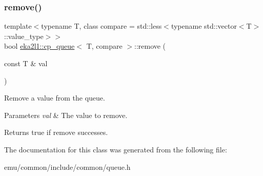 \subsubsection{\texorpdfstring{remove()}{remove()}}
{\footnotesize\ttfamily template$<$typename T, class compare = std\+::less$<$typename std\+::vector$<$\+T$>$\+::value\+\_\+type$>$$>$ \\
bool \mbox{\hyperlink{classeka2l1_1_1cp__queue}{eka2l1\+::cp\+\_\+queue}}$<$ T, compare $>$\+::remove (\begin{DoxyParamCaption}\item[{const T \&}]{val }\end{DoxyParamCaption})\hspace{0.3cm}{\ttfamily [inline]}}



Remove a value from the queue. 


\begin{DoxyParams}{Parameters}
{\em val} & The value to remove. \\
\hline
\end{DoxyParams}
\begin{DoxyReturn}{Returns}
true if remove successes. 
\end{DoxyReturn}


The documentation for this class was generated from the following file\+:\begin{DoxyCompactItemize}
\item 
emu/common/include/common/queue.\+h\end{DoxyCompactItemize}
